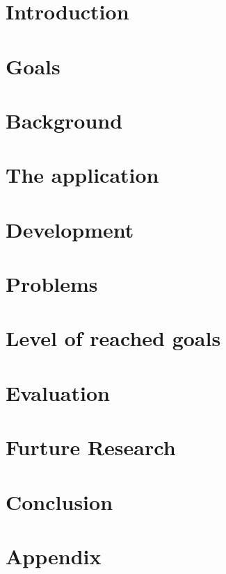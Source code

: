 \documentclass[a4paper,pt12]{article}
\begin{document}
\tableofcontents
\newpage

\section{Introduction}



\section{Goals}


\section{Background}


\section{The application}


\section{Development}


\section{Problems}


\section{Level of reached goals}


\section{Evaluation}


\section{Furture Research}


\section{Conclusion}


\newpage

%
%

\newpage
\section{Appendix}

\end{document}
